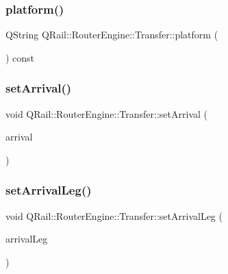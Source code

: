 \mbox{\label{classQRail_1_1RouterEngine_1_1Transfer_a17256666f753e0be8601273905a36973}} 
\subsubsection{\texorpdfstring{platform()}{platform()}}
{\footnotesize\ttfamily Q\+String Q\+Rail\+::\+Router\+Engine\+::\+Transfer\+::platform (\begin{DoxyParamCaption}{ }\end{DoxyParamCaption}) const}

\mbox{\label{classQRail_1_1RouterEngine_1_1Transfer_a75048b3bc70006d55561281efa569acc}} 
\subsubsection{\texorpdfstring{setArrival()}{setArrival()}}
{\footnotesize\ttfamily void Q\+Rail\+::\+Router\+Engine\+::\+Transfer\+::set\+Arrival (\begin{DoxyParamCaption}\item[{\mbox{\hyperlink{classQRail_1_1RouterEngine_1_1RouteLegEnd}{Q\+Rail\+::\+Router\+Engine\+::\+Route\+Leg\+End}} $\ast$}]{arrival }\end{DoxyParamCaption})}

\mbox{\label{classQRail_1_1RouterEngine_1_1Transfer_a0fd3d974fc24be429574228d714403ce}} 
\subsubsection{\texorpdfstring{setArrivalLeg()}{setArrivalLeg()}}
{\footnotesize\ttfamily void Q\+Rail\+::\+Router\+Engine\+::\+Transfer\+::set\+Arrival\+Leg (\begin{DoxyParamCaption}\item[{\mbox{\hyperlink{classQRail_1_1RouterEngine_1_1RouteLeg}{Q\+Rail\+::\+Router\+Engine\+::\+Route\+Leg}} $\ast$}]{arrival\+Leg }\end{DoxyParamCaption})}

